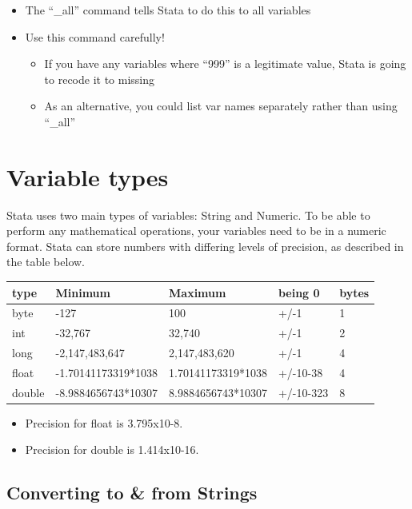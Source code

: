 \documentclass[]{book}
\providecommand{\tightlist}{%
  \setlength{\itemsep}{0pt}\setlength{\parskip}{0pt}}
\begin{document}
\begin{itemize}
\tightlist
\item
  The ``\_all'' command tells Stata to do this to all variables
\item
  Use this command carefully!

  \begin{itemize}
  \tightlist
  \item
    If you have any variables where ``999'' is a legitimate value, Stata is going to recode it to missing
  \item
    As an alternative, you could list var names separately rather than using ``\_all''
  \end{itemize}
\end{itemize}

\hypertarget{variable-types}{%
\section{Variable types}\label{variable-types}}

Stata uses two main types of variables: String and Numeric. To be able to perform any mathematical operations, your variables need to be in a numeric format. Stata can store numbers with differing levels of precision, as described in the table below.

\begin{longtable}[]{@{}lllll@{}}
\toprule
type & Minimum & Maximum & being 0 & bytes\tabularnewline
\midrule
\endhead
byte & -127 & 100 & +/-1 & 1\tabularnewline
int & -32,767 & 32,740 & +/-1 & 2\tabularnewline
long & -2,147,483,647 & 2,147,483,620 & +/-1 & 4\tabularnewline
float & -1.70141173319*1038 & 1.70141173319*1038 & +/-10-38 & 4\tabularnewline
double & -8.9884656743*10307 & 8.9884656743*10307 & +/-10-323 & 8\tabularnewline
\bottomrule
\end{longtable}

\begin{itemize}
\tightlist
\item
  Precision for float is 3.795x10-8.
\item
  Precision for double is 1.414x10-16.
\end{itemize}

\hypertarget{converting-to-from-strings}{%
\subsection{Converting to \& from Strings}\label{converting-to-from-strings}}
\end{document}
